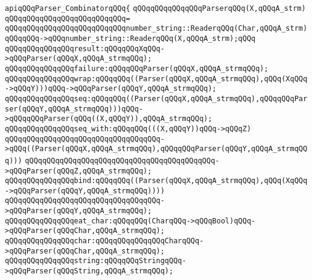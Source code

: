 \newline
\newline
\verb|apiqQQqParser_CombinatorqQQq{|\newline
\newline
\verb|qQQqqQQqqQQqqQQqParserqQQq(X,qQQqA_strm)|\newline
\verb|qQQqqQQqqQQqqQQqqQQqqQQqqQQq=|\newline
\verb|qQQqqQQqqQQqqQQqqQQqqQQqqQQqnumber_string::ReaderqQQq(Char,qQQqA_strm)qQQqqQQq->qQQqnumber_string::ReaderqQQq(X,qQQqA_strm);qQQq|\newline
\newline
\verb|qQQqqQQqqQQqqQQqresult:qQQqqQQqXqQQq->qQQqParser(qQQqX,qQQqA_strmqQQq);|\newline
\newline
\verb|qQQqqQQqqQQqqQQqfailure:qQQqqQQqParser(qQQqX,qQQqA_strmqQQq);|\newline
\newline
\verb|qQQqqQQqqQQqqQQqwrap:qQQqqQQq((Parser(qQQqX,qQQqA_strmqQQq),qQQq(XqQQq->qQQqY)))qQQq->qQQqParser(qQQqY,qQQqA_strmqQQq);|\newline
\newline
\verb|qQQqqQQqqQQqqQQqseq:qQQqqQQq((Parser(qQQqX,qQQqA_strmqQQq),qQQqqQQqParser(qQQqY,qQQqA_strmqQQq)))qQQq->qQQqqQQqParser(qQQq((X,qQQqY)),qQQqA_strmqQQq);|\newline
\verb|qQQqqQQqqQQqqQQqseq_with:qQQqqQQq(((X,qQQqY))qQQq->qQQqZ)|\newline
\verb|qQQqqQQqqQQqqQQqqQQqqQQqqQQqqQQqqQQq->qQQq((Parser(qQQqX,qQQqA_strmqQQq),qQQqqQQqParser(qQQqY,qQQqA_strmqQQq)))|\newline
\verb|qQQqqQQqqQQqqQQqqQQqqQQqqQQqqQQqqQQqqQQqqQQq->qQQqParser(qQQqZ,qQQqA_strmqQQq);|\newline
\newline
\verb|qQQqqQQqqQQqqQQqbind:qQQqqQQq((Parser(qQQqX,qQQqA_strmqQQq),qQQq(XqQQq->qQQqParser(qQQqY,qQQqA_strmqQQq))))|\newline
\verb|qQQqqQQqqQQqqQQqqQQqqQQqqQQqqQQqqQQq->qQQqParser(qQQqY,qQQqA_strmqQQq);|\newline
\newline
\verb|qQQqqQQqqQQqqQQqeat_char:qQQqqQQq(CharqQQq->qQQqBool)qQQq->qQQqParser(qQQqChar,qQQqA_strmqQQq);|\newline
\newline
\verb|qQQqqQQqqQQqqQQqchar:qQQqqQQqqQQqqQQqCharqQQq->qQQqParser(qQQqChar,qQQqA_strmqQQq);|\newline
\verb|qQQqqQQqqQQqqQQqstring:qQQqqQQqStringqQQq->qQQqParser(qQQqString,qQQqA_strmqQQq);|\newline

